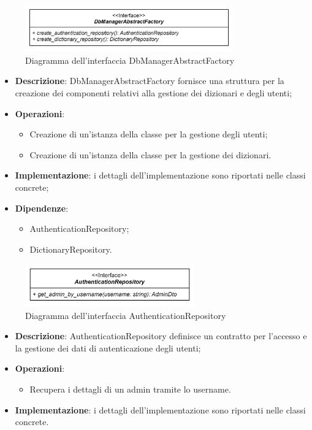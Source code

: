  \label{DbManagerAbstractFactory}
\begin{figure}[H]
    \centering
    \includegraphics[width=0.8\textwidth]{assets/Backend/db_manager_abstract_factory.png}
    \caption{Diagramma dell'interfaccia DbManagerAbstractFactory}
  \end{figure}
\begin{itemize}
    \item \textbf{Descrizione}: DbManagerAbstractFactory fornisce una struttura per la creazione dei componenti relativi alla gestione dei dizionari e degli utenti;
    \item \textbf{Operazioni}:
    \begin{itemize}
      \item Creazione di un'istanza della classe per la gestione degli utenti;
      \item Creazione di un'istanza della classe per la gestione dei dizionari.
    \end{itemize}
    \item \textbf{Implementazione}: i dettagli dell'implementazione sono riportati nelle classi concrete;
    \item \textbf{Dipendenze}:
    \begin{itemize}
      \item AuthenticationRepository;
      \item DictionaryRepository.
    \end{itemize}
\end{itemize} 

 \label{AuthenticationRepository}
\begin{figure}[H]
    \centering
    \includegraphics[width=0.65\textwidth]{assets/Backend/authentication_repository.png}
    \caption{Diagramma dell'interfaccia AuthenticationRepository}
  \end{figure}
\begin{itemize}
    \item \textbf{Descrizione}: AuthenticationRepository definisce un contratto per l'accesso e la gestione dei dati di autenticazione degli utenti;
    \item \textbf{Operazioni}: 
    \begin{itemize}
      \item Recupera i dettagli di un admin tramite lo username.
    \end{itemize}
    \item \textbf{Implementazione}: i dettagli dell'implementazione sono riportati nelle classi concrete.
\end{itemize}


